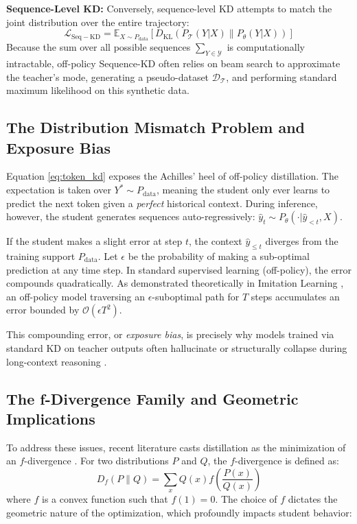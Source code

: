 \documentclass{article}
\newcommand{\E}{\mathbb{E}}
\newcommand{\KL}{D_{\mathrm{KL}}}
\newcommand{\ptheta}{P_\theta}
\newcommand{\pteacher}{P_{\mathcal{T}}}
\newcommand{\pdata}{P_{\mathrm{data}}}
\newcommand{\loss}{\mathcal{L}}
\begin{document}
\textbf{Sequence-Level KD:} Conversely, sequence-level KD attempts to match the joint distribution over the entire trajectory:
\begin{equation}
    \loss_{\mathrm{Seq-KD}} = \E_{X \sim \pdata} \left[ \KL \left( \pteacher(Y|X) \parallel \ptheta(Y|X) \right) \right]
\end{equation}
Because the sum over all possible sequences $\sum_{Y \in \mathcal{Y}}$ is computationally intractable, off-policy Sequence-KD often relies on beam search to approximate the teacher's mode, generating a pseudo-dataset $\mathcal{D}_{\mathcal{T}}$, and performing standard maximum likelihood on this synthetic data.

\subsection{The Distribution Mismatch Problem and Exposure Bias}
Equation \ref{eq:token_kd} exposes the Achilles' heel of off-policy distillation. The expectation is taken over $Y^* \sim \pdata$, meaning the student only ever learns to predict the next token given a \textit{perfect} historical context. During inference, however, the student generates sequences auto-regressively: $\hat{y}_t \sim \ptheta(\cdot | \hat{y}_{<t}, X)$. 

If the student makes a slight error at step $t$, the context $\hat{y}_{\le t}$ diverges from the training support $\pdata$. Let $\epsilon$ be the probability of making a sub-optimal prediction at any time step. In standard supervised learning (off-policy), the error compounds quadratically. As demonstrated theoretically in Imitation Learning \citep{ross2011reduction}, an off-policy model traversing an $\epsilon$-suboptimal path for $T$ steps accumulates an error bounded by $\mathcal{O}(\epsilon T^2)$.

This compounding error, or \textit{exposure bias}, is precisely why models trained via standard KD on teacher outputs often hallucinate or structurally collapse during long-context reasoning \citep{2305.15717}. 

\subsection{The f-Divergence Family and Geometric Implications}
To address these issues, recent literature casts distillation as the minimization of an $f$-divergence \citep{2307.15190}. For two distributions $P$ and $Q$, the $f$-divergence is defined as:
\begin{equation}
    D_f(P \parallel Q) = \sum_{x} Q(x) f\left(\frac{P(x)}{Q(x)}\right)
\end{equation}
where $f$ is a convex function such that $f(1)=0$. The choice of $f$ dictates the geometric nature of the optimization, which profoundly impacts student behavior:
\end{document}
